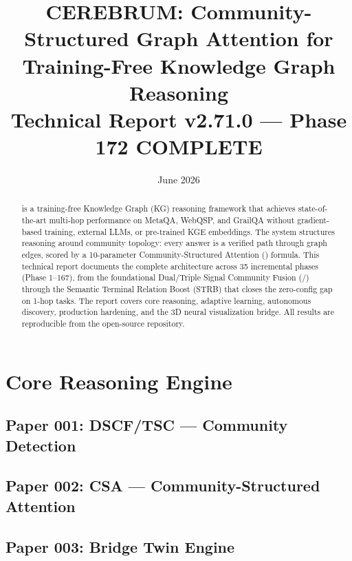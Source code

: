 \documentclass[12pt,a4paper]{article}
\title{
  \textbf{CEREBRUM: Community-Structured Graph Attention for\\
  Training-Free Knowledge Graph Reasoning} \\[0.5em]
  \large Technical Report v2.71.0 — Phase 172 COMPLETE
}
\date{June 2026}
\begin{document}
\maketitle
\thispagestyle{empty}

\begin{abstract}
\CEREBRUM{} is a training-free Knowledge Graph (KG) reasoning framework that
achieves state-of-the-art multi-hop performance on MetaQA, WebQSP, and GrailQA
without gradient-based training, external LLMs, or pre-trained KGE embeddings.
The system structures reasoning around community topology: every answer is a
verified path through graph edges, scored by a 10-parameter Community-Structured
Attention (\CSA{}) formula. This technical report documents the complete
architecture across 35 incremental phases (Phase 1–167), from the foundational
Dual/Triple Signal Community Fusion (\DSCF{}/\TSC{}) through the
Semantic Terminal Relation Boost (\textsc{STRB}) that closes the zero-config gap
on 1-hop tasks. The report covers core reasoning, adaptive learning, autonomous
discovery, production hardening, and the 3D neural visualization bridge.
All results are reproducible from the open-source repository.
\end{abstract}

\newpage
\tableofcontents
\newpage

\part{Core Reasoning Engine}

\chapter*{Paper 001: DSCF/TSC — Community Detection}


\chapter*{Paper 002: CSA — Community-Structured Attention}


\chapter*{Paper 003: Bridge Twin Engine}

\end{document}

